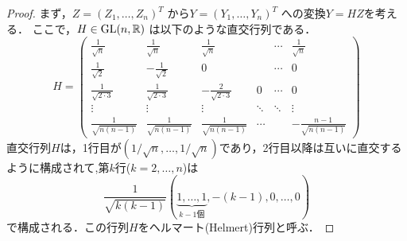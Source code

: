 \documentclass[main.tex]{subfiles}
\begin{document}
\begin{proof}
  まず，$Z=(Z_1, \dots, Z_n)^T$ から$Y=(Y_1, \dots, Y_n)^T$ への変換$Y=HZ$を考える．
  ここで，$H \in \mathrm{GL}(n,\mathbb{R})$ は以下のような直交行列である．
  \begin{equation}
    H = \begin{pmatrix}
      \frac{1}{\sqrt{n}} & \frac{1}{\sqrt{n}} & \frac{1}{\sqrt{n}} & & \cdots & \frac{1}{\sqrt{n}} \\
      \frac{1}{\sqrt{2}} & -\frac{1}{\sqrt{2}} & 0 &  & \cdots & 0 \\
      \frac{1}{\sqrt{2\cdot 3}} & \frac{1}{\sqrt{2\cdot 3}} & -\frac{2}{\sqrt{2\cdot 3}} &  0  & \cdots & 0 \\
      \vdots & \vdots & \vdots & \ddots & \ddots & \vdots \\
      \frac{1}{\sqrt{n(n-1)}} & \frac{1}{\sqrt{n(n-1)}} & \frac{1}{\sqrt{n(n-1)}} & \cdots & & -\frac{n-1}{\sqrt{n(n-1)}}
    \end{pmatrix}
  \end{equation}
直交行列$H$は，1行目が$(1/\sqrt{n}, \dots, 1/\sqrt{n})$であり，2行目以降は互いに直交するように構成されて,第$k$行($k=2,\dots,n$)は
\begin{equation*}
  \frac{1}{\sqrt{k(k-1)}}(\underbrace{1, \dots, 1}_{k-1個}, -(k-1), 0, \dots, 0)
\end{equation*}
で構成される．この行列$H$をヘルマート(Helmert)行列と呼ぶ．


\end{proof}
\end{document}

